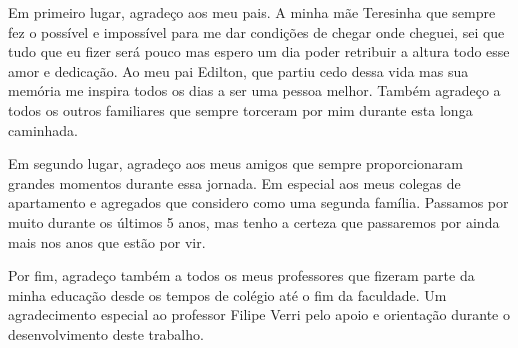 Em primeiro lugar, agradeço aos meu pais. 
A minha mãe Teresinha que sempre fez o possível e impossível para me dar condições de chegar onde cheguei, sei que tudo que eu fizer será pouco mas espero um dia poder retribuir a altura todo esse amor e dedicação. 
Ao meu pai Edilton, que partiu cedo dessa vida mas sua memória me inspira todos os dias a ser uma pessoa melhor.
Também agradeço a todos os outros familiares que sempre torceram por mim durante esta longa caminhada.

Em segundo lugar, agradeço aos meus amigos que sempre proporcionaram grandes momentos durante essa jornada. 
Em especial aos meus colegas de apartamento e agregados que considero como uma segunda família. 
Passamos por muito durante os últimos 5 anos, mas tenho a certeza que passaremos por ainda mais nos anos que estão por vir.

Por fim, agradeço também a todos os meus professores que fizeram parte da minha educação desde os tempos de colégio até o fim da faculdade. Um agradecimento especial ao professor Filipe Verri pelo apoio e orientação durante o desenvolvimento deste trabalho.
